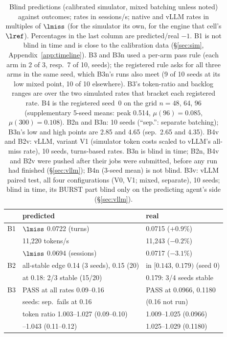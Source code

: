 \begin{table}[!tp]
\centering\footnotesize
\caption{Blind predictions (calibrated simulator, mixed batching unless noted) against outcomes; rates in sessions/s; native and vLLM rates in multiples of $\lmiss$ (for the simulator its own, for the engine that cell's $\lref$). Percentages in the last column are predicted/real $-1$. B1 is not blind in time and is close to the calibration data (\S\ref{sec:sim}, Appendix~\ref{app:timeline}). B3 and B3n used a per-arm pass rule (each arm in 2 of 3, resp.\ 7 of 10, seeds); the registered rule asks for all three arms in the same seed, which B3n's runs also meet (9 of 10 seeds at its low mixed point, 10 of 10 elsewhere). B3's token-ratio and backlog ranges are over the two simulated rates that bracket each registered rate. B4 is the registered seed~0 on the grid $n=48$, 64, 96 (supplementary 5-seed means: peak 0.514, $\mu(96)=0.085$, $\mu(300)=0.108$). B2n and B3n: 10 seeds (``sep.'': separate batching); B3n's low and high points are 2.85 and 4.65 (sep.\ 2.65 and 4.35). B4v and B2v: vLLM, variant V1 (simulator token costs scaled to vLLM's all-miss rate), 10 seeds, turns-based rates. B3n is blind in time; B2n, B4v and B2v were pushed after their jobs were submitted, before any run had finished (\S\ref{sec:vllm}); B4n (3-seed mean) is not blind. B3v: vLLM paired test, all four configurations (V0, V1; mixed, separate), 10 seeds; blind in time, its BURST part blind only on the predicting agent's side (\S\ref{sec:vllm}).}\label{tab:blind}
\setlength{\tabcolsep}{2.5pt}
\begin{tabular}{@{}l l l@{}}
\toprule
 & predicted & real\\
\midrule
B1 & $\lmiss$ 0.0722 (turns) & 0.0715 ($+0.9\%$)\\
   & 11,220 tokens/s & 11,243 ($-0.2\%$)\\
   & $\lmiss$ 0.0694 (sessions) & 0.0717 ($-3.1\%$)\\
\addlinespace[1pt]
B2 & all-stable edge 0.14 (3 seeds), 0.15 (20) & in $[0.143,\,0.179)$ (seed 0)\\
   & at 0.18: 2/3 stable (15/20) & 0.179: 3/4 seeds stable\\
\addlinespace[1pt]
B3 & PASS at all rates 0.09--0.16 & PASS at 0.0966, 0.1180\\
   & \quad 20 seeds: sep.\ fails at 0.16 & \quad (0.16 not run)\\
   & token ratio 1.003--1.027 (0.09--0.10) & 1.009--1.025 (0.0966)\\
   & \quad 1.025--1.043 (0.11--0.12) & 1.025--1.029 (0.1180)\\

\end{tabular}
\end{table}
